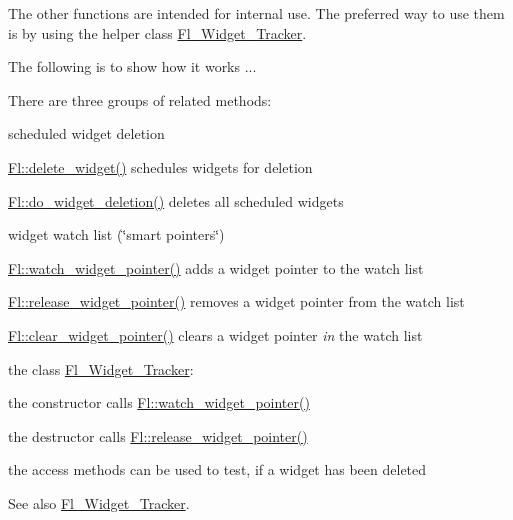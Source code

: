 The other functions are intended for internal use. The preferred way to use them is by using the helper class \hyperlink{class_fl___widget___tracker}{Fl\+\_\+\+Widget\+\_\+\+Tracker}.

The following is to show how it works ...

There are three groups of related methods\+:


\begin{DoxyEnumerate}
\item scheduled widget deletion
\end{DoxyEnumerate}

\hyperlink{group__fl__del__widget_ga5908e37029f697e8b2f86a2f48d98b18}{Fl\+::delete\+\_\+widget()} schedules widgets for deletion
\begin{DoxyItemize}
\item \hyperlink{group__fl__del__widget_gab3643acf692210ed29df86032b902869}{Fl\+::do\+\_\+widget\+\_\+deletion()} deletes all scheduled widgets
\begin{DoxyEnumerate}
\item widget watch list (\char`\"{}smart pointers\char`\"{})
\end{DoxyEnumerate}
\item \hyperlink{group__fl__del__widget_gaa6dcacf7538e5424c8366f7a569c0e05}{Fl\+::watch\+\_\+widget\+\_\+pointer()} adds a widget pointer to the watch list
\item \hyperlink{group__fl__del__widget_gabcf12c2424e03d16611f69cf8cf5a033}{Fl\+::release\+\_\+widget\+\_\+pointer()} removes a widget pointer from the watch list
\item \hyperlink{group__fl__del__widget_ga23a2b4509c67d3d90029ccc493f2575d}{Fl\+::clear\+\_\+widget\+\_\+pointer()} clears a widget pointer {\itshape in} the watch list
\begin{DoxyEnumerate}
\item the class \hyperlink{class_fl___widget___tracker}{Fl\+\_\+\+Widget\+\_\+\+Tracker}\+:
\end{DoxyEnumerate}
\item the constructor calls \hyperlink{group__fl__del__widget_gaa6dcacf7538e5424c8366f7a569c0e05}{Fl\+::watch\+\_\+widget\+\_\+pointer()}
\item the destructor calls \hyperlink{group__fl__del__widget_gabcf12c2424e03d16611f69cf8cf5a033}{Fl\+::release\+\_\+widget\+\_\+pointer()}
\item the access methods can be used to test, if a widget has been deleted \begin{DoxySeeAlso}{See also}
\hyperlink{class_fl___widget___tracker}{Fl\+\_\+\+Widget\+\_\+\+Tracker}. 
\end{DoxySeeAlso}

\end{DoxyItemize}

